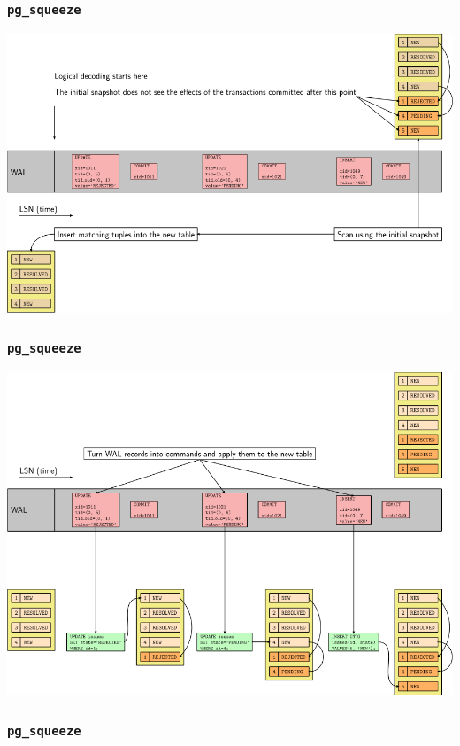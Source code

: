 \begin{frame}
  \frametitle{\texttt{pg\_squeeze}}
  \begin{center}
\includegraphics[height=\sizeforimages\textheight]{pg_squeeze_02.png}
  \end{center}
\end{frame}

\begin{frame}
  \frametitle{\texttt{pg\_squeeze}}
  \begin{center}
\includegraphics[height=\sizeforimages\textheight]{pg_squeeze_03.png}
  \end{center}
\end{frame}

\begin{frame}
        \frametitle{\texttt{pg\_squeeze}}
\end{frame}


